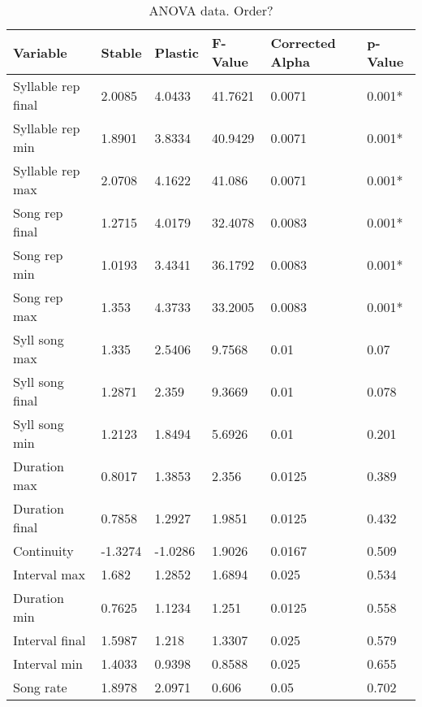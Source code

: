 \documentclass{article}\usepackage[]{graphicx}\usepackage[]{color}
\begin{document}
\begin{table}[ht]
\centering
\caption{ANOVA data.  Order?}
\begin{tabular}{llllll}
  \hline
Variable & Stable & Plastic & F-Value & Corrected Alpha & p-Value \\ 
  \hline
Syllable rep final & 2.0085 & 4.0433 & 41.7621 & 0.0071 & 0.001* \\ 
  Syllable rep min & 1.8901 & 3.8334 & 40.9429 & 0.0071 & 0.001* \\ 
  Syllable rep max & 2.0708 & 4.1622 & 41.086 & 0.0071 & 0.001* \\ 
  Song rep final & 1.2715 & 4.0179 & 32.4078 & 0.0083 & 0.001* \\ 
  Song rep min & 1.0193 & 3.4341 & 36.1792 & 0.0083 & 0.001* \\ 
  Song rep max & 1.353 & 4.3733 & 33.2005 & 0.0083 & 0.001* \\ 
  Syll song max & 1.335 & 2.5406 & 9.7568 & 0.01 & 0.07 \\ 
  Syll song final & 1.2871 & 2.359 & 9.3669 & 0.01 & 0.078 \\ 
  Syll song min & 1.2123 & 1.8494 & 5.6926 & 0.01 & 0.201 \\ 
  Duration max & 0.8017 & 1.3853 & 2.356 & 0.0125 & 0.389 \\ 
  Duration final & 0.7858 & 1.2927 & 1.9851 & 0.0125 & 0.432 \\ 
  Continuity & -1.3274 & -1.0286 & 1.9026 & 0.0167 & 0.509 \\ 
  Interval max & 1.682 & 1.2852 & 1.6894 & 0.025 & 0.534 \\ 
  Duration min & 0.7625 & 1.1234 & 1.251 & 0.0125 & 0.558 \\ 
  Interval final & 1.5987 & 1.218 & 1.3307 & 0.025 & 0.579 \\ 
  Interval min & 1.4033 & 0.9398 & 0.8588 & 0.025 & 0.655 \\ 
  Song rate & 1.8978 & 2.0971 & 0.606 & 0.05 & 0.702 \\ 
   \hline
\end{tabular}
\end{table}
\end{document}
